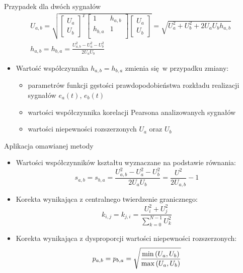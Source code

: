 \documentclass[12pt, polish, aspectratio = 169]{beamer}
\begin{document}
\begin{frame}{Przypadek dla dwóch sygnałów}
\begin{gather}
U_{a,b} = \sqrt{
\begin{bmatrix}
U_{a} \\ U_{b}
\end{bmatrix}^{T}
\begin{bmatrix}
1         & h_{a,b} \\
h_{b,a}   & 1       \\
\end{bmatrix}
\begin{bmatrix}
U_{a} \\ U_{b}
\end{bmatrix}} =
\sqrt{U_{a}^{2} + U_{b}^{2} + 2 U_{a} U_{b} h_{a,b}}
\label{eq:unc_mattwo} \\
h_{a,b} = h_{b,a} = \frac{U_{a,b}^{2} - U_{a}^{2} - U_{b}^{2}}{2 U_{a} U_{b}} \label{eq:unc_cohertwo}
\end{gather}
\begin{itemize}
\item Wartość współczynnika $h_{a,b} = h_{b,a}$ zmienia się w przypadku zmiany:
	\begin{itemize}
	\item parametrów funkcji gęstości prawdopodobieństwa rozkładu realizacji sygnałów $e_{a}(t)$, $e_{b}(t)$
	\item wartości współczynnika korelacji Pearsona analizowanych sygnałów
	\item wartości niepewności rozszerzonych $U_{a}$ oraz $U_{b}$
	\end{itemize}
\end{itemize}
\end{frame}

\begin{frame}{Aplikacja omawianej metody}
\begin{itemize}
\item Wartości współczynników kształtu wyznaczane na podstawie równania:
\begin{equation}
s_{a,b} = s_{b,a} = \frac{U_{a,b}^{2} - U_{a}^{2} - U_{b}^{2}}{2 U_{a} U_{b}} = \frac{U^{2}}{2 U_{a,b}} - 1 \label{eq:unc_shapertwo}
\end{equation}
\item Korekta wynikająca z centralnego twierdzenie granicznego:
\begin{equation}
k_{i,j} = k_{j,i} = \frac{U_{i}^{2} + U_{j}^{2}}{\sum _{k = 0} ^{N-1} U_{k}^{2}} \label{eq:unc_cohercorrb}
\end{equation}
\item Korekta wynikająca z dysproporcji wartości niepewności rozszerzonych:
\begin{equation}
p_{a,b} = p_{b,a} = \sqrt{\frac{\min \left(U_{a}, U_{b}\right)}{\max \left(U_{a}, U_{b}\right)}} \label{eq:unc_cohercorra}
\end{equation}
\end{itemize}
\end{frame}
\end{document}

